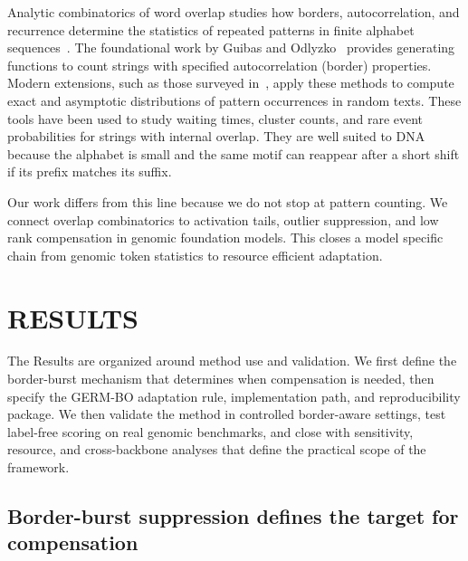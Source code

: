 \documentclass[12pt,letterpaper]{article}
\begin{document}
Analytic combinatorics of word overlap studies how borders, autocorrelation, and recurrence determine the statistics of repeated patterns in finite alphabet sequences~\cite{guibas1981,wordstats2022}. The foundational work by Guibas and Odlyzko~\cite{guibas1981} provides generating functions to count strings with specified autocorrelation (border) properties. Modern extensions, such as those surveyed in~\cite{wordstats2022}, apply these methods to compute exact and asymptotic distributions of pattern occurrences in random texts. These tools have been used to study waiting times, cluster counts, and rare event probabilities for strings with internal overlap. They are well suited to DNA because the alphabet is small and the same motif can reappear after a short shift if its prefix matches its suffix.

Our work differs from this line because we do not stop at pattern counting. We connect overlap combinatorics to activation tails, outlier suppression, and low rank compensation in genomic foundation models. This closes a model specific chain from genomic token statistics to resource efficient adaptation.

\section*{RESULTS}

The Results are organized around method use and validation. We first define the border-burst mechanism that determines when compensation is needed, then specify the GERM-BO adaptation rule, implementation path, and reproducibility package. We then validate the method in controlled border-aware settings, test label-free scoring on real genomic benchmarks, and close with sensitivity, resource, and cross-backbone analyses that define the practical scope of the framework.

\subsection*{Border-burst suppression defines the target for compensation}
\end{document}
